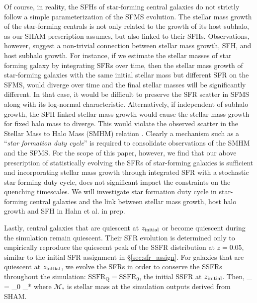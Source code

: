 Of course, in reality, the SFHs of star-forming central 
galaxies do not strictly follow a simple parameterization of
the SFMS evolution. The stellar mass growth of
the star-forming centrals is not only related to the growth 
of its host subhalo, as our SHAM prescription assumes, but 
also linked to their SFHs. Observations, however, suggest 
a non-trivial connection between stellar mass growth, SFH, 
and host subhalo growth. For instance, if we estimate the 
stellar masses of star forming galaxy by integrating SFRs over time, 
then the stellar mass growth of star-forming galaxies with the same 
initial stellar mass but different SFR on the SFMS, would diverge 
over time and the final stellar masses will be significantly different. 
In that case, it would be difficult to preserve the SFR scatter 
in SFMS along with its log-normal characteristic. 
Alternatively, if independent of subhalo growth, the SFH linked 
stellar mass growth would cause the stellar mass growth for fixed
halo mass to diverge. This would violate the observed 
scatter in the Stellar Mass to Halo Mass (SMHM) relation 
\citep{Leauthaud:2012aa, Tinker:2013aa, Zu:2015aa, Gu:2016aa}.
Clearly a mechanism such as a ``{\em star formation duty cycle}'' 
is required to consolidate observations of the SMHM and the SFMS. 
For the scope of this paper, however, we find that our above
prescription of statistically evolving the SFRs of 
star-forming galaxies is sufficient and incorporating 
stellar mass growth through integrated SFR with a stochastic  
star forming duty cycle, does not significant impact the 
constraints on the quenching timescales. We will investigate 
star formation duty cycle in star-forming central galaxies 
and the link between stellar mass growth, host halo growth
and SFH in Hahn et al. in prep.

Lastly, central galaxies that are quiescent at $z_\mathrm{initial}$ 
or become quiescent during the simulation remain quiescent.
Their SFR evolution is determined only to empirically 
reproduce the quiescent peak of the SSFR distribution at $z=0.05$, similar to the 
initial SFR assignment in \S\ref{sec:sfr_assign}. For 
galaxies that are quiescent at $z_\mathrm{initial}$, we evolve the 
SFRs in order to conserve the SSFRs throughout the 
simulation: $\mathrm{SSFR}_\mathrm{Q} = \mathrm{SSFR}_0$, 
the initial SSFR at $z_\mathrm{initial}$. Then, 
\beq \label{eq:sfr_q}
_ = _0 \times {}_*
\eeq
where $\mathcal{M}_*$ is stellar mass at the simulation outputs 
derived from SHAM. 

